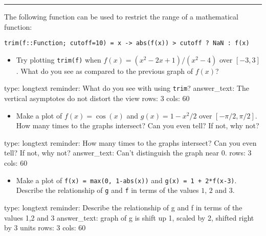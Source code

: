 \documentclass[12pt]{article}
\begin{document}
\begin{center}\rule{3in}{0.4pt}\end{center}

The following function can be used to restrict the range of a
mathematical function:



\begin{verbatim}
trim(f::Function; cutoff=10) = x -> abs(f(x)) > cutoff ? NaN : f(x)
\end{verbatim}
\begin{itemize}
\itemsep1pt\parskip0pt
\item
  Try plotting \texttt{trim(f)} when $f(x) = (x^2 - 2x + 1)/(x^2 - 4)$
  over $[-3, 3]$. What do you see as compared to the previous graph of
  $f(x)$?
\end{itemize}

\begin{answer}
type: longtext
reminder: What do you see with using \verb+trim+?
answer_text: The vertical asymptotes do not distort the view 
rows: 3
cols: 60
\end{answer}

\begin{itemize}
\itemsep1pt\parskip0pt
\item
  Make a plot of $f(x) = \cos(x)$ and $g(x) = 1 - x^2/2$ over
  $[-\pi/2, \pi/2]$. How many times to the graphs intersect? Can you
  even tell? If not, why not?
\end{itemize}

\begin{answer}
type: longtext
reminder: How many times to the graphs intersect? Can you even tell? If not, why not?
answer_text: Can't distinguish the graph near 0. 
rows: 3
cols: 60
\end{answer}

\begin{itemize}
\itemsep1pt\parskip0pt
\item
  Make a plot of \texttt{f(x) = max(0, 1-abs(x))} and
  \texttt{g(x) = 1 +   2*f(x-3)}. Describe the relationship of
  \texttt{g} and \texttt{f} in terms of the values $1$, $2$ and $3$.
\end{itemize}

\begin{answer}
type: longtext
reminder: Describe the relationship of g and f in terms of the values 1,2 and 3
answer_text: graph of g is shift up 1, scaled by 2, shifted right by 3 units 
rows: 3
cols: 60
\end{answer}
\end{document}
